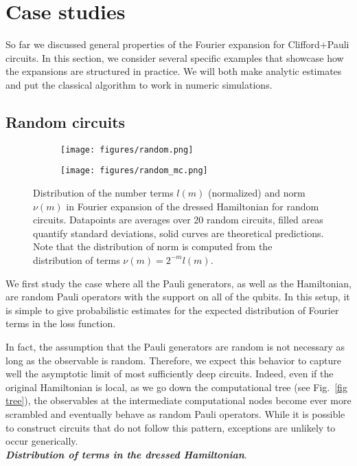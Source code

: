 \documentclass[twocolumn, amsfonts, amssymb, aps, nofootinbib]{revtex4-2}
\newcommand{\CP}{Clifford+Pauli}
\begin{document}
\section{Case studies} \label{sec cases}
So far we discussed general properties of the Fourier expansion for \CP{} circuits. In this section, we consider several specific examples that showcase how the expansions are structured in practice. We will both make analytic estimates and put the classical algorithm to work in numeric simulations.
\subsection{Random circuits}
\begin{figure}
	\begin{subfigure}{0.4\textwidth}
		\texttt{[image: figures/random.png]}
		\caption{}
		\label{fig random nodes}
	\end{subfigure}	

	\begin{subfigure}{0.4\textwidth}
		\texttt{[image: figures/random\_mc.png]}
		\caption{}		
		\label{fig random scaling}
	\end{subfigure}
	
	\caption{Distribution of the number terms $l(m)$ (normalized) and norm $\nu(m)$ in Fourier expansion of the dressed Hamiltonian for random circuits. Datapoints are averages over 20 random circuits, filled areas quantify standard deviations, solid curves are theoretical predictions. Note that the distribution of norm is computed from the distribution of terms $\nu(m)=2^{-m}l(m)$.}
	\label{fig random}
\end{figure}
We first study the case where all the Pauli generators, as well as the Hamiltonian, are random Pauli operators with the support on all of the qubits. In this setup, it is simple to give probabilistic estimates for the expected distribution of Fourier terms in the loss function. 

In fact, the assumption that the Pauli generators are random is not necessary as long as the observable is random. Therefore, we expect this behavior to capture well the asymptotic limit of most sufficiently deep circuits. Indeed, even if the original Hamiltonian is local, as we go down the computational tree (see Fig.~\ref{fig tree}), the observables at the intermediate computational nodes become ever more scrambled and eventually behave as random Pauli operators. While it is possible to construct circuits that do not follow this pattern, exceptions are unlikely to occur generically.\\[4pt]
\textbf{\textit{Distribution of terms in the dressed Hamiltonian}}. 
\end{document}
